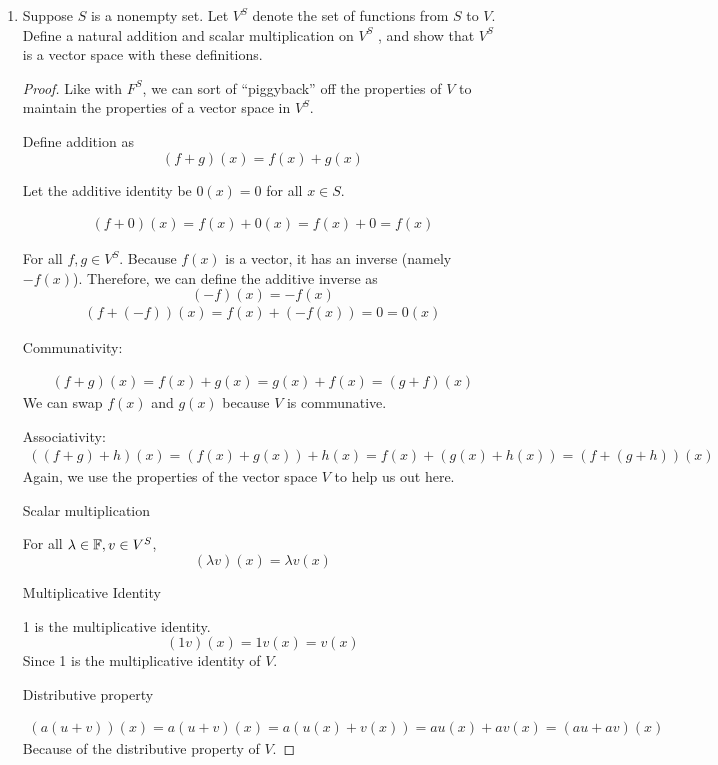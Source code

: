 \begin{enumerate}
    \item[7] Suppose $S$ is a nonempty set. Let $V^S$ denote the set of functions from $S$ to $V$.
Define a natural addition and scalar multiplication on $V^S$
, and show that $V^S$
is a vector space with these definitions.

\begin{proof}
    Like with $F^S$, we can sort of ``piggyback'' off the properties of $V$ to maintain the properties of a vector space in $V^S$. 

    Define addition as 
    \[(f + g)(x) = f(x) + g(x)\]

    Let the additive identity be $0(x) = 0$ for all $x \in S$.

    \begin{align*}
        (f + 0)(x) = f(x) + 0(x) = f(x) + 0 = f(x)
    \end{align*}


    For all $f, g \in V^S$. Because $f(x)$ is a vector, it has an inverse (namely $-f(x)$). Therefore, we can define the additive inverse as 
    \[(-f)(x) = -f(x)\] 
    \begin{align*}
        (f + (-f))(x) = f(x) + (-f(x)) = 0 = 0(x)
    \end{align*}

    Communativity: 

    \begin{align*}
        (f + g)(x) = f(x) + g(x) = g(x) + f(x) = (g + f)(x)
    \end{align*}
    We can swap $f(x)$ and $g(x)$ because $V$ is communative.

    Associativity:
    \begin{align*}
        ((f + g) + h)(x) = (f(x) + g(x)) + h(x) = f(x) + (g(x) + h(x)) = (f + (g + h))(x)
    \end{align*}
    Again, we use the properties of the vector space $V$ to help us out here.

    Scalar multiplication 

    For all $\lambda \in \mathbb{F}, v \in V^S$, 
    \[(\lambda v)(x) = \lambda v(x)\]

    Multiplicative Identity 

    1 is the multiplicative identity. 
    \[(1v)(x) = 1v(x) = v(x)\]
    Since 1 is the multiplicative identity of $V$.

    Distributive property 

    \begin{align*}
        (a(u + v))(x) = a(u + v)(x) = a(u(x) + v(x)) = au(x) + av(x) = (au + av)(x)
    \end{align*}
    Because of the distributive property of $V$.


\end{proof}
\end{enumerate}
